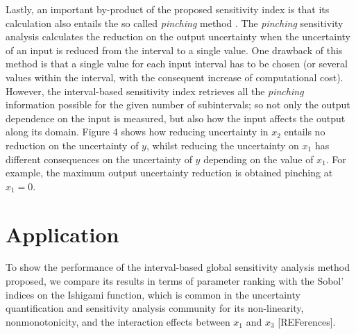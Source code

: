 \documentclass[twocolumn]{rps-esrel2022}
\begin{document}
Lastly, an important by-product of the proposed sensitivity index is that its calculation also entails the so called \textit{pinching} method \cite{ferson2006sensitivity, gray2022inference}.
The \textit{pinching} sensitivity analysis calculates the reduction on the output uncertainty when the uncertainty of an input is reduced from the interval to a single value.
One drawback of this method is that a single value for each input interval has to be chosen (or several values within the interval, with the consequent
increase of computational cost).
However, the interval-based sensitivity index retrieves all the \textit{pinching} information possible for the given number of subintervals; so not only the
output dependence on the input is measured, but also how the input affects the output along its domain.
Figure 4 shows how reducing uncertainty in $x_2$ entails no reduction on the uncertainty of $y$, whilst reducing the uncertainty on $x_1$ has different consequences on the
uncertainty of $y$ depending on the value of $x_1$.
For example, the maximum output uncertainty reduction is obtained pinching at $x_1 = 0$.



\section{Application}

To show the performance of the interval-based global sensitivity analysis method proposed, we compare
its results in terms of parameter ranking with the Sobol' indices on the Ishigami function, which is common in the uncertainty quantification
and sensitivity analysis community for its non-linearity, nonmonotonicity, and the interaction effects between $x_1$ and $x_3$ [REFerences].
\end{document}
